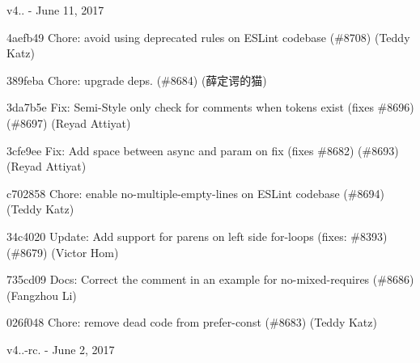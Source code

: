 v4.. -\/ June 11, 2017


\begin{DoxyItemize}
\item 4aefb49 Chore\+: avoid using deprecated rules on E\+S\+Lint codebase (\#8708) (Teddy Katz)
\item 389feba Chore\+: upgrade deps. (\#8684) (薛定谔的猫)
\item 3da7b5e Fix\+: Semi-\/\+Style only check for comments when tokens exist (fixes \#8696) (\#8697) (Reyad Attiyat)
\item 3cfe9ee Fix\+: Add space between async and param on fix (fixes \#8682) (\#8693) (Reyad Attiyat)
\item c702858 Chore\+: enable no-\/multiple-\/empty-\/lines on E\+S\+Lint codebase (\#8694) (Teddy Katz)
\item 34c4020 Update\+: Add support for parens on left side for-\/loops (fixes\+: \#8393) (\#8679) (Victor Hom)
\item 735cd09 Docs\+: Correct the comment in an example for {\ttfamily no-\/mixed-\/requires} (\#8686) (Fangzhou Li)
\item 026f048 Chore\+: remove dead code from prefer-\/const (\#8683) (Teddy Katz)
\end{DoxyItemize}

v4..-\/rc. -\/ June 2, 2017


